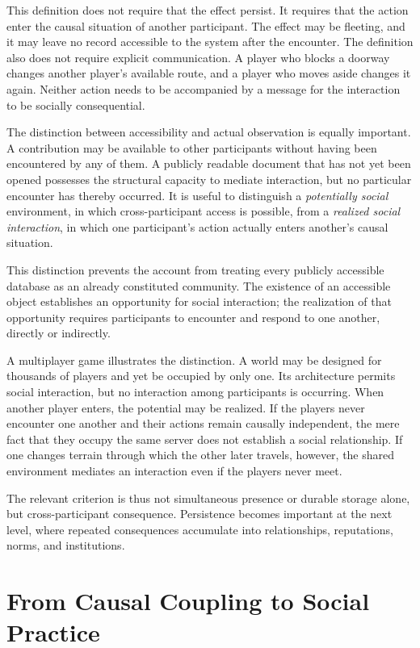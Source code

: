 \documentclass[11pt]{article}
\theoremstyle{remark}
\begin{document}
This definition does not require that the effect persist.
It requires that the action enter the causal situation of
another participant. The effect may be fleeting, and it may
leave no record accessible to the system after the encounter.
The definition also does not require explicit communication.
A player who blocks a doorway changes another player's
available route, and a player who moves aside changes it
again. Neither action needs to be accompanied by a message
for the interaction to be socially consequential.

The distinction between accessibility and actual observation
is equally important. A contribution may be available to
other participants without having been encountered by any
of them. A publicly readable document that has not yet been
opened possesses the structural capacity to mediate
interaction, but no particular encounter has thereby
occurred. It is useful to distinguish a \emph{potentially
social} environment, in which cross-participant access is
possible, from a \emph{realized social interaction}, in
which one participant's action actually enters another's
causal situation.

This distinction prevents the account from treating every
publicly accessible database as an already constituted
community. The existence of an accessible object establishes
an opportunity for social interaction; the realization of
that opportunity requires participants to encounter and
respond to one another, directly or indirectly.

A multiplayer game illustrates the distinction. A world
may be designed for thousands of players and yet be occupied
by only one. Its architecture permits social interaction,
but no interaction among participants is occurring. When
another player enters, the potential may be realized. If
the players never encounter one another and their actions
remain causally independent, the mere fact that they occupy
the same server does not establish a social relationship.
If one changes terrain through which the other later
travels, however, the shared environment mediates an
interaction even if the players never meet.

The relevant criterion is thus not simultaneous presence
or durable storage alone, but cross-participant consequence.
Persistence becomes important at the next level, where
repeated consequences accumulate into relationships,
reputations, norms, and institutions.

\section{From Causal Coupling to Social Practice}
\label{sec:coupling-practice}
\end{document}
